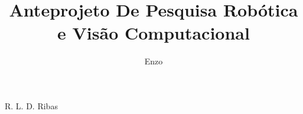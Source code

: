 \documentclass[bcl,numbers]{coppe}
\begin{document}
  \title{Anteprojeto De Pesquisa Robótica e Visão Computacional}
  \author{Enzo}{R. L. D. Ribas}



  \maketitle

  \small
  \tableofcontents
  

  \mainmatter

  
  
  
  
  
  
  



  \backmatter
   
  


  
\end{document}
